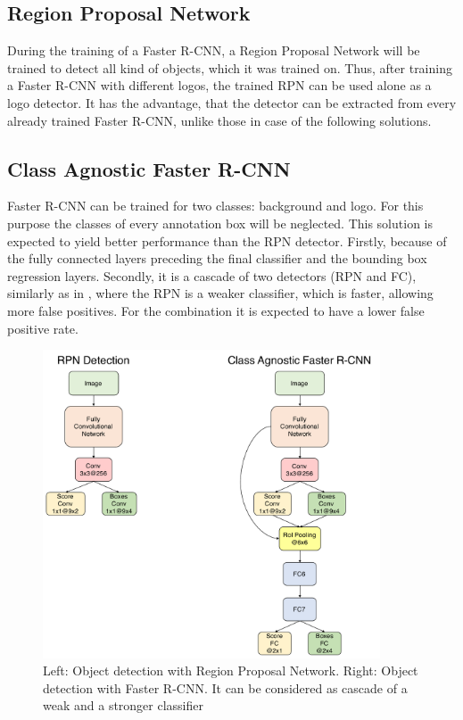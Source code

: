 \subsection{Region Proposal Network}
During the training of a Faster R-CNN, a Region Proposal Network will be trained to detect all kind of objects, which it was trained on. Thus, after training a Faster R-CNN with different logos, the trained RPN can be used alone as a logo detector. It has the advantage, that the detector can be extracted from every already trained Faster R-CNN, unlike those in case of the following solutions.
\bigbreak
\subsection{Class Agnostic Faster R-CNN}\label{ss:classagnosticdetector}
Faster R-CNN can be trained for two classes: background and logo. For this purpose the classes of every annotation box will be neglected. This solution is expected to yield better performance than the RPN detector. Firstly, because of the fully connected layers preceding the final classifier and the bounding box regression layers. Secondly, it is a cascade of two detectors (RPN and FC), similarly as in \cite{Viola:2004:RRF:966432.966458}, where the RPN is a weaker classifier, which is faster, allowing more false positives. For the combination it is expected to have a lower false positive rate.
\begin{figure}
  \centering
  \includegraphics[width=100mm]{images/mt/detectors.pdf}
  \caption{Left: Object detection with Region Proposal Network. Right: Object detection with Faster R-CNN. It can be considered as cascade of a weak and a stronger classifier}
  \label{f:detectors}
\end{figure}
